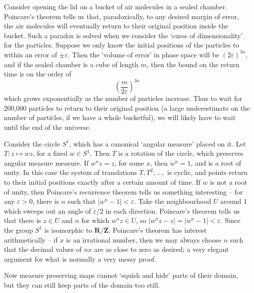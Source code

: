 \begin{example}
    Consider opening the lid on a bucket of air molecules in a sealed chamber. Poincare's theorem tells us that, paradoxically, to any desired margin of error, the air molecules will eventually return to their original position inside the bucket. Such a paradox is solved when we consider the `curse of dimensionality' for the particles. Suppose we only know the initial positions of the particles to within an error of $\pm \varepsilon$. Then the `volume of error' in phase space will be $(2\varepsilon)^{3n}$, and if the sealed chamber is a cube of length $m$, then the bound on the return time is on the order of
    \[ \left( \frac{m}{2\varepsilon} \right)^{3n} \]
    which grows exponentially as the number of particles increase. Thus to wait for 200,000 particles to return to their original position (a large underestimate on the number of particles, if we have a whole bucketful), we will likely have to wait until the end of the universe.
\end{example}

\begin{example}
    Consider the circle $S^1$, which has a canonical `angular measure' placed on it. Let $T:z \mapsto wz$, for a fixed $w \in S^1$. Then $T$ is a rotation of the circle, which preserves angular measure measure. If $w^n z = z$, for some $x$, then $w^n = 1$, and is a root of unity. In this case the system of translations $T, T^2, \dots,$ is cyclic, and points return to their initial positions exactly after a certain amount of time. If $w$ is not a root of unity, then Poincare's recurrence theorem tells us something interesting -- for any $\varepsilon > 0$, there is $n$ such that $|w^n - 1| < \varepsilon$. Take the neighbourhood $U$ around $1$ which sweeps out an angle of $\varepsilon/2$ in each direction. Poincare's theorem tells us that there is $z \in U$ and $n$ for which $w^n z \in U$, so $|w^n z - z| = |w^n - 1| < \varepsilon$. Since the group $S^1$ is isomorphic to $\mathbf{R}/\mathbf{Z}$, Poincare's theorem has interest arithmetically -- if $x$ is an irrational number, then we may always choose $n$ such that the decimal values of $nx$ are as close to zero as desired; a very elegant argument for what is normally a very messy proof.
\end{example}

Now measure preserving maps cannot `squish and hide' parts of their domain, but they can still keep parts of the domain too still. 

